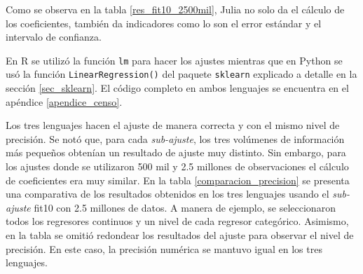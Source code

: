 Como se observa en la tabla \ref{res_fit10_2500mil}, \textsf{Julia} no solo da el cálculo de los coeficientes, también da indicadores como lo son el error estándar y el intervalo de confianza. 

En \textsf{R} se utilizó la función \texttt{lm} para hacer los ajustes mientras que en \textsf{Python} se usó la función \texttt{LinearRegression()} del paquete \texttt{sklearn} explicado a detalle en la sección \ref{sec_sklearn}. El código completo en ambos lenguajes se encuentra en el apéndice \ref{apendice_censo}. 

Los tres lenguajes hacen el ajuste de manera correcta y con el mismo nivel de precisión. Se notó que, para cada \textit{sub-ajuste}, los tres volúmenes de información más pequeños obtenían un resultado de ajuste muy distinto. Sin embargo, para los ajustes donde se utilizaron 500 mil y 2.5 millones de observaciones el cálculo de coeficientes era muy similar. En la tabla \ref{comparacion_precision} se presenta una comparativa de los resultados obtenidos en los tres lenguajes usando el \textit{sub-ajuste} \textsf{fit10} con 2.5 millones de datos. A manera de ejemplo, se seleccionaron todos los regresores continuos y un nivel de cada regresor categórico. Asimismo, en la tabla se omitió redondear los resultados del ajuste para observar el nivel de precisión. En este caso, la precisión numérica se mantuvo igual en los tres lenguajes. 

